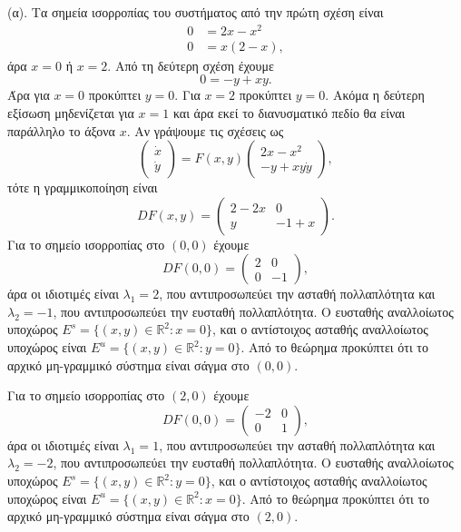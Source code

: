 \begin{solution}
    (α). Τα σημεία ισορροπίας του συστήματος από την πρώτη σχέση είναι
    \begin{align*}
        0 &= 2x - x^2 \\
        0 &= x(2- x),
    \end{align*}
    άρα \( x = 0 \) ή \( x = 2 \). Από τη δεύτερη σχέση έχουμε
    \[
        0 = -y + xy.
    \]
    Άρα για \( x = 0 \) προκύπτει \( y = 0 \). Για \( x = 2 \) προκύπτει \( y =
    0 \). Ακόμα η δεύτερη εξίσωση μηδενίζεται για \( x = 1 \) και άρα εκεί το
    διανυσματικό πεδίο θα είναι παράλληλο το άξονα \( x \). Αν γράψουμε τις
    σχέσεις ως
    \[
        \begin{pmatrix}
            \dot{x} \\
            \dot{y}
        \end{pmatrix} = F(x, y)
        \begin{pmatrix}
            2x - x^2 \\
            -y + xy
            \dot{y}
        \end{pmatrix},
    \]
    τότε η γραμμικοποίηση είναι
    \[
        DF(x, y) =
        \begin{pmatrix}
            2 - 2x & 0 \\
            y & -1 + x
        \end{pmatrix}.
    \]
    Για το σημείο ισορροπίας στο \( (0, 0) \) έχουμε
    \[
        DF(0, 0) =
        \begin{pmatrix}
            2 & 0 \\
            0 & -1
        \end{pmatrix},
    \]
    άρα οι ιδιοτιμές είναι \( \lambda_1 = 2 \), που αντιπροσωπεύει την ασταθή πολλαπλότητα
    και \( \lambda_2 = -1 \), που αντιπροσωπεύει την ευσταθή πολλαπλότητα. Ο ευσταθής
    αναλλοίωτος υποχώρος \( E^s = \{ (x, y)\in \mathbb{R}^2: x = 0 \} \), και ο αντίστοιχος
    ασταθής αναλλοίωτος υποχώρος είναι \( E^u = \{ (x, y)\in \mathbb{R}^2: y = 0 \} \).
    Από το θεώρημα  προκύπτει ότι το αρχικό μη-γραμμικό σύστημα είναι σάγμα
    στο \( (0, 0) \).

    Για το σημείο ισορροπίας στο \( (2, 0) \) έχουμε
    \[
        DF(0, 0) =
        \begin{pmatrix}
            -2 & 0 \\
            0 & 1
        \end{pmatrix},
    \]
    άρα οι ιδιοτιμές είναι \( \lambda_1 = 1 \), που αντιπροσωπεύει την ασταθή πολλαπλότητα
    και \( \lambda_2 = -2 \), που αντιπροσωπεύει την ευσταθή πολλαπλότητα. Ο ευσταθής
    αναλλοίωτος υποχώρος \( E^s = \{ (x, y)\in \mathbb{R}^2: y = 0 \} \), και ο αντίστοιχος
    ασταθής αναλλοίωτος υποχώρος είναι \( E^u = \{ (x, y)\in \mathbb{R}^2: x = 0 \} \).
    Από το θεώρημα  προκύπτει ότι το αρχικό μη-γραμμικό σύστημα είναι σάγμα
    στο \( (2, 0) \).


\end{solution}
